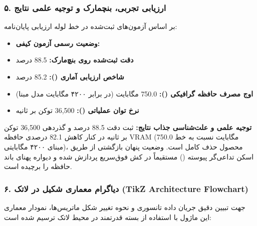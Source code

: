 \subsubsection*{۵. ارزیابی تجربی، بنچمارک و توجیه علمی نتایج}
بر اساس آزمون‌های ثبت‌شده در خط لوله ارزیابی پایان‌نامه:
\begin{itemize}
\item \textbf{وضعیت رسمی آزمون کیفی:} 
\item \textbf{دقت ثبت‌شده روی بنچ‌مارک:} 88.5 درصد
\item \textbf{شاخص ارزیابی آماری ():} 85.2 درصد
\item \textbf{اوج مصرف حافظه گرافیکی ():} 750.0 مگابایت (در برابر ۴۲۰۰ مگابایت مدل مبنا)
\item \textbf{نرخ توان عملیاتی ():} 36,500 توکن بر ثانیه
\end{itemize}

\textbf{توجیه علمی و علت‌شناسی جذاب نتایج:}
ثبت دقت 88.5 درصد و گذردهی 36,500 توکن بر ثانیه در کنار کاهش 82.1 درصدی حافظه VRAM (750.0 مگابایت نسبت به خط مبنای ۴۲۰۰ مگابایتی)، محصول حذف کامل  است. وضعیت پنهان بازگشتی از طریق اسکن تداعی‌گر پیوسته () مستقیماً در کش فوق‌سریع  پردازش شده و دیواره پهنای باند حافظه  را برچیده است.



\subsubsection*{۶. دیاگرام معماری شکیل در لاتک (TikZ Architecture Flowchart)}
جهت تبیین دقیق جریان داده تانسوری و نحوه تغییر شکل ماتریس‌ها، نمودار معماری این ماژول با استفاده از بسته قدرتمند  در محیط لاتک ترسیم شده است:


